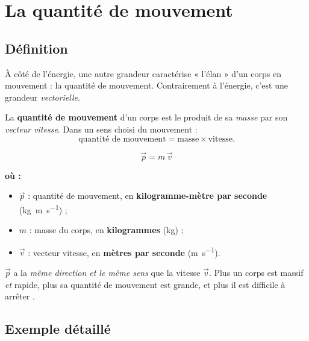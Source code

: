 \documentclass[11pt,a4paper]{article}
\newenvironment{ou}{%
  \par\smallskip\noindent\textbf{où :}\nopagebreak
  \begin{itemize}[leftmargin=1.8em,topsep=2pt,itemsep=1.5pt,parsep=0pt]}%
  {\end{itemize}}
\newcommand{\vv}[1]{\vec{#1}}
\begin{document}
\section{La quantité de mouvement}
\subsection{Définition}

À côté de l'énergie, une autre grandeur caractérise « l'élan » d'un corps en mouvement : la quantité
de mouvement. Contrairement à l'énergie, c'est une grandeur \emph{vectorielle}.

\begin{definition}
La \textbf{quantité de mouvement} d'un corps est le produit de sa \emph{masse} par son \emph{vecteur
vitesse}. Dans un sens choisi du mouvement :
\[
\text{quantité de mouvement}=\text{masse}\times\text{vitesse}.
\]
\end{definition}

\begin{formule}
\[
\boxed{\;\vv p=m\,\vv v\;}
\]
\begin{ou}
  \item $\vv p$ : quantité de mouvement, en \textbf{kilogramme-mètre par seconde} (\si{\kilogram\metre\per\second}) ;
  \item $m$ : masse du corps, en \textbf{kilogrammes} (\si{\kilogram}) ;
  \item $\vv v$ : vecteur vitesse, en \textbf{mètres par seconde} (\si{\metre\per\second}).
\end{ou}
$\vv p$ a la \emph{même direction et le même sens} que la vitesse $\vv v$. Plus un corps est massif
\emph{et} rapide, plus sa quantité de mouvement est grande, et plus il est \og difficile à arrêter \fg.
\end{formule}

\subsection{Exemple détaillé}
\end{document}
